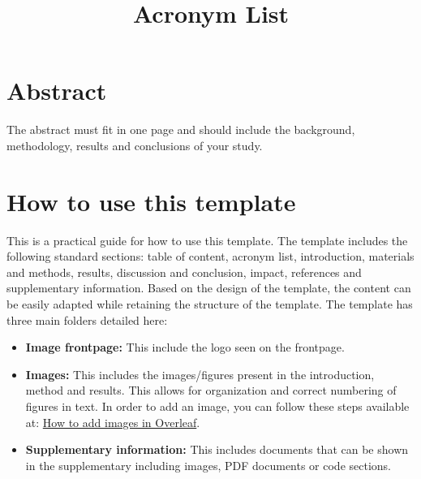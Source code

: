 \documentclass[11pt]{article}
\begin{document}
\newpage
\section*{Abstract}
\noindent
The abstract must fit in one page and should include the background, methodology, results and conclusions of your study.

\thispagestyle{empty}

\newpage
\tableofcontents
\thispagestyle{empty}

\newpage
\title{Acronym List}

\date{}
\maketitle
\thispagestyle{empty}


\newpage
\setcounter{page}{1}
\section{How to use this template}
This is a practical guide for how to use this template. The template includes the following standard sections: table of content, acronym list, introduction, materials and methods, results, discussion and conclusion, impact, references and supplementary information. Based on the design of the template, the content can be easily adapted while retaining the structure of the template. The template has three main folders detailed here:
\begin{itemize}
\item \textbf{Image frontpage:} This include the logo seen on the frontpage.

\item \textbf{Images:} This includes the images/figures present in the introduction, method and results. This allows for organization and correct numbering of figures in text. In order to add an image, you can follow these steps available at: \href{https://www.overleaf.com/learn/latex/Inserting_Images}{How to add images in Overleaf}.

\item \textbf{Supplementary information: }This includes documents that can be shown in the supplementary including images, PDF documents or code sections.
\end{itemize}
\end{document}

